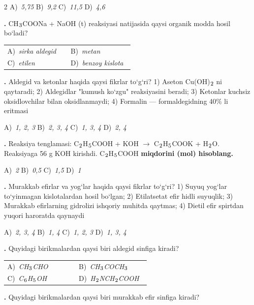 \documentclass[11pt,a4paper]{article}
\renewcommand{\textsubscript}[1]{\ensuremath{_{\text{\fontsize{8}{8}\selectfont #1}}}}
\newcommand{\qn}[1]{\textbf{\fontsize{11.5}{13}\selectfont #1}}
\newcommand{\qsep}{\par\vspace{1pt}\noindent\rule{0pt}{0.4pt}\par\vspace{5pt}}
\begin{document}
\begin{multicols}{2}
\noindent A)~\textsl{5,75} \hfill B)~\textsl{9,2} \hfill C)~\textsl{11,5} \hfill D)~\textsl{4,6}\par
\qsep
\noindent\qn{23.} CH\textsubscript{3}COONa + NaOH (t) reaksiyasi natijasida qaysi organik modda hosil bo`ladi?

\noindent\begin{tabular}{@{}p{0.47\linewidth}@{}p{0.47\linewidth}@{}}
A)~\textsl{sirka aldegid} & B)~\textsl{metan} \\
C)~\textsl{etilen} & D)~\textsl{benzoy kislota} \\
\end{tabular}\par
\qsep
\noindent\qn{24.} Aldegid va ketonlar haqida qaysi fikrlar to`g`ri? 1) Aseton Cu(OH)\textsubscript{2} ni qaytaradi; 2) Aldegidlar "kumush ko`zgu" reaksiyasini beradi; 3) Ketonlar kuchsiz oksidlovchilar bilan oksidlanmaydi; 4) Formalin --- formaldegidning 40\% li eritmasi

\noindent A)~\textsl{1, 2, 3} \hfill B)~\textsl{2, 3, 4} \hfill C)~\textsl{1, 3, 4} \hfill D)~\textsl{2, 4}\par
\qsep
\noindent\qn{25.} Reaksiya tenglamasi: C\textsubscript{2}H\textsubscript{5}COOH + KOH $\to$ C\textsubscript{2}H\textsubscript{5}COOK + H\textsubscript{2}O. Reaksiyaga 56 g KOH kirishdi. C\textsubscript{2}H\textsubscript{5}COOH \textbf{miqdorini (mol) hisoblang.}

\noindent A)~\textsl{2} \hfill B)~\textsl{0,5} \hfill C)~\textsl{1,5} \hfill D)~\textsl{1}\par
\qsep
\noindent\qn{26.} Murakkab efirlar va yog`lar haqida qaysi fikrlar to`g`ri? 1) Suyuq yog`lar to`yinmagan kislotalardan hosil bo`lgan; 2) Etilatsetat efir hidli suyuqlik; 3) Murakkab efirlarning gidrolizi ishqoriy muhitda qaytmas; 4) Dietil efir spirtdan yuqori haroratda qaynaydi

\noindent A)~\textsl{2, 3, 4} \hfill B)~\textsl{1, 4} \hfill C)~\textsl{1, 2, 3} \hfill D)~\textsl{1, 3, 4}\par
\qsep
\noindent\qn{27.} Quyidagi birikmalardan qaysi biri aldegid sinfiga kiradi?

\noindent\begin{tabular}{@{}p{0.47\linewidth}@{}p{0.47\linewidth}@{}}
A)~\textsl{CH\textsubscript{3}CHO} & B)~\textsl{CH\textsubscript{3}COCH\textsubscript{3}} \\
C)~\textsl{C\textsubscript{6}H\textsubscript{5}OH} & D)~\textsl{H\textsubscript{2}NCH\textsubscript{2}COOH} \\
\end{tabular}\par
\qsep
\noindent\qn{28.} Quyidagi birikmalardan qaysi biri murakkab efir sinfiga kiradi?


\end{multicols}
\end{document}

